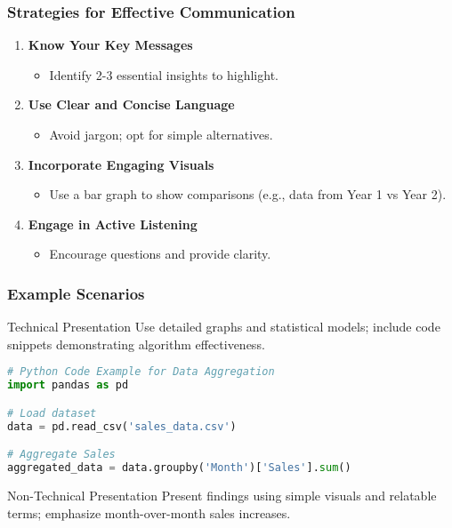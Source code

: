 \documentclass[aspectratio=169]{beamer}
\begin{document}
\begin{frame}[fragile]
    \frametitle{Strategies for Effective Communication}
    \begin{enumerate}
        \item \textbf{Know Your Key Messages}
            \begin{itemize}
                \item Identify 2-3 essential insights to highlight.
            \end{itemize}
        
        \item \textbf{Use Clear and Concise Language}
            \begin{itemize}
                \item Avoid jargon; opt for simple alternatives.
            \end{itemize}
            
        \item \textbf{Incorporate Engaging Visuals}
            \begin{itemize}
                \item Use a bar graph to show comparisons (e.g., data from Year 1 vs Year 2).
            \end{itemize}
        
        \item \textbf{Engage in Active Listening}
            \begin{itemize}
                \item Encourage questions and provide clarity.
            \end{itemize}
    \end{enumerate}
\end{frame}

\begin{frame}[fragile]
    \frametitle{Example Scenarios}
    \begin{block}{Technical Presentation}
        Use detailed graphs and statistical models; include code snippets demonstrating algorithm effectiveness.
        \begin{lstlisting}[language=Python]
# Python Code Example for Data Aggregation
import pandas as pd

# Load dataset
data = pd.read_csv('sales_data.csv')

# Aggregate Sales
aggregated_data = data.groupby('Month')['Sales'].sum()
        \end{lstlisting}
    \end{block}
    
    \begin{block}{Non-Technical Presentation}
        Present findings using simple visuals and relatable terms; emphasize month-over-month sales increases.
    \end{block}
\end{frame}
\end{document}
